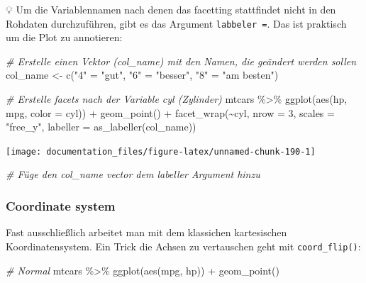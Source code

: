 \documentclass[
]{article}
\newenvironment{Shaded}{\begin{snugshade}}{\end{snugshade}}
\newcommand{\AttributeTok}[1]{\textcolor[rgb]{0.77,0.63,0.00}{#1}}
\newcommand{\CommentTok}[1]{\textcolor[rgb]{0.56,0.35,0.01}{\textit{#1}}}
\newcommand{\DecValTok}[1]{\textcolor[rgb]{0.00,0.00,0.81}{#1}}
\newcommand{\FunctionTok}[1]{\textcolor[rgb]{0.00,0.00,0.00}{#1}}
\newcommand{\NormalTok}[1]{#1}
\newcommand{\OtherTok}[1]{\textcolor[rgb]{0.56,0.35,0.01}{#1}}
\newcommand{\SpecialCharTok}[1]{\textcolor[rgb]{0.00,0.00,0.00}{#1}}
\newcommand{\StringTok}[1]{\textcolor[rgb]{0.31,0.60,0.02}{#1}}
\begin{document}
💡 Um die Variablennamen nach denen das facetting stattfindet nicht in den Rohdaten durchzuführen, gibt es das Argument \texttt{labbeler\ =}. Das ist praktisch um die Plot zu annotieren:

\begin{Shaded}
\begin{Highlighting}[]
\CommentTok{\# Erstelle einen Vektor (col\_name) mit den Namen, die geändert werden sollen}
\NormalTok{col\_name }\OtherTok{\textless{}{-}} \FunctionTok{c}\NormalTok{(}\StringTok{"4"} \OtherTok{=} \StringTok{"gut"}\NormalTok{, }\StringTok{"6"} \OtherTok{=} \StringTok{"besser"}\NormalTok{, }\StringTok{"8"} \OtherTok{=} \StringTok{"am besten"}\NormalTok{)}

\CommentTok{\# Erstelle facets nach der Variable cyl (Zylinder)}
\NormalTok{mtcars }\SpecialCharTok{\%\textgreater{}\%}
  \FunctionTok{ggplot}\NormalTok{(}\FunctionTok{aes}\NormalTok{(hp, mpg, }\AttributeTok{color =}\NormalTok{ cyl)) }\SpecialCharTok{+}
  \FunctionTok{geom\_point}\NormalTok{() }\SpecialCharTok{+}
  \FunctionTok{facet\_wrap}\NormalTok{(}\SpecialCharTok{\textasciitilde{}}\NormalTok{cyl, }\AttributeTok{nrow =} \DecValTok{3}\NormalTok{, }\AttributeTok{scales =} \StringTok{"free\_y"}\NormalTok{, }\AttributeTok{labeller =} \FunctionTok{as\_labeller}\NormalTok{(col\_name)) }
\end{Highlighting}
\end{Shaded}

\begin{center}\texttt{[image: documentation\_files/figure-latex/unnamed-chunk-190-1]} \end{center}

\begin{Shaded}
\begin{Highlighting}[]
\CommentTok{\# Füge den col\_name vector dem labeller Argument hinzu}
\end{Highlighting}
\end{Shaded}

\hypertarget{coordinate-system}{%
\subsubsection{Coordinate system}\label{coordinate-system}}

Fast ausschließlich arbeitet man mit dem klassichen kartesischen Koordinatensystem. Ein Trick die Achsen zu vertauschen geht mit \texttt{coord\_flip()}:

\begin{Shaded}
\begin{Highlighting}[]
\CommentTok{\# Normal}
\NormalTok{mtcars }\SpecialCharTok{\%\textgreater{}\%}
  \FunctionTok{ggplot}\NormalTok{(}\FunctionTok{aes}\NormalTok{(mpg, hp)) }\SpecialCharTok{+}
  \FunctionTok{geom\_point}\NormalTok{()}
\end{Highlighting}
\end{Shaded}
\end{document}
